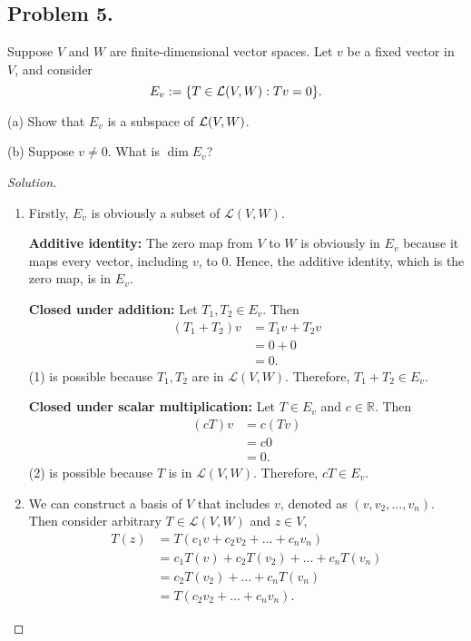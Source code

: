 \documentclass{article}
\begin{document}
\subsection*{Problem 5.}
Suppose $V$ and $W$ are finite-dimensional vector spaces.
Let $v$ be a fixed vector in $V$, and consider
$$ E_v := \{ T\in {\cal L}(V,W): Tv=0 \}.$$
\begin{description}
\item{(a)} Show that $E_v$ is a subspace of ${\cal L}(V,W)$.
\item{(b)} Suppose $v\neq 0$. What is $\dim E_v$?
\end{description}
\begin{proof}[Solution]\indent
    \begin{enumerate}[label=(\alph*)]
        \item 
        Firstly, $E_v$ is obviously a subset of $\mathcal{L}(V,W)$.


        \textbf{Additive identity:} The zero map from $V$ to $W$ is obviously in $E_v$ because it 
        maps every vector, including $v$, to $0$. Hence, the additive identity, which is the zero 
        map, is in $E_v$.

        \textbf{Closed under addition:} Let $T_1, T_2\in E_v$. Then 
        \begin{align}
            (T_1+T_2)v &= T_1v + T_2v \\
            & = 0 + 0 \nonumber \\
            & = 0. \nonumber
        \end{align}
        (1) is possible because $T_1, T_2$ are in $\mathcal{L}(V,W)$. Therefore, $T_1+T_2\in E_v$.

        \textbf{Closed under scalar multiplication:} Let $T\in E_v$ and $c\in\mathbb{R}$. Then
        \begin{align}
            (cT)v &= c(Tv) \\
            & = c0 \nonumber \\
            & = 0. \nonumber
        \end{align}
        (2) is possible because $T$ is in $\mathcal{L}(V,W)$. Therefore, $cT\in E_v$.

        \item
        We can construct a basis of $V$ that includes $v$, denoted as 
        $(v, v_2, \dots, v_n)$. Then consider arbitrary $T\in\mathcal{L}(V,W)$ and $z\in V$, 
        \begin{align*}
            T(z) & = T(c_1v + c_2v_2 + \dots + c_nv_n) \\
            & = c_1T(v) + c_2T(v_2) + \dots + c_nT(v_n) \\
            & = c_2T(v_2) + \dots + c_nT(v_n) \\
            & = T(c_2v_2 + \dots + c_nv_n).
        \end{align*}
        

\end{enumerate}
\end{proof}
\end{document}

